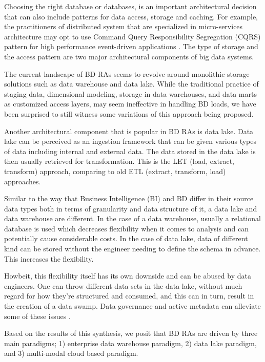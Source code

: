 \documentclass{ieeeaccess}
\begin{document}
Choosing the right database or databases, is an important architectural decision that can also include patterns for data access, storage and caching. For example, the practitioners of distributed system that are specialized in micro-services architecture may opt to use Command Query Responsibility Segregation (CQRS) pattern for high performance event-driven applications \cite{marquez2018actual}. The type of storage and the access pattern are two major architectural components of big data systems. 

The current landscape of BD RAs seems to revolve around monolithic storage solutions such as data warehouse and data lake. While the traditional practice of staging data, dimensional modeling, storage in data warehouses, and data marts as customized access layers, may seem ineffective in handling BD loads, we have been surprised to still witness some variations of this approach being proposed.  

Another architectural component that is popular in BD RAs is data lake. Data lake can be perceived as an ingestion framework that can be given various types of data including internal and external data. The data stored in the data lake is then usually retrieved for transformation. This is the LET (load, extract, transform) approach, comparing to old ETL (extract, transform, load) approaches. 

Similar to the way that Business Intelligence (BI) and BD differ in their source data types both in terms of granularity and data structure of it, a data lake and data warehouse are different. In the case of a data warehouse, usually a relational database is used which decreases flexibility when it comes to analysis and can potentially cause considerable costs. In the case of data lake, data of different kind can be stored without the engineer needing to define the schema in advance. This increases the flexibility.

Howbeit, this flexibility itself has its own downside and can be abused by data engineers. One can throw different data sets in the data lake, without much regard for how they’re structured and consumed, and this can in turn, result in the creation of a data swamp. Data governance and active metadata can alleviate some of these issues \cite{monolithToMesh}.

Based on the results of this synthesis, we posit that BD RAs are driven by three main paradigms; 1) enterprise data warehouse paradigm, 2) data lake paradigm, and 3) multi-modal cloud based paradigm. 
\end{document}
